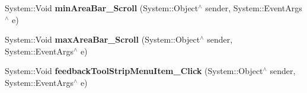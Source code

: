 \begin{DoxyCompactItemize}
System\+::\+Void {\bfseries min\+Area\+Bar\+\_\+\+Scroll} (System\+::\+Object$^\wedge$ sender, System\+::\+Event\+Args$^\wedge$ e)
\item 
\mbox{\label{class_gaze_track_g_u_i_1_1_g_u_i_a21a48dc15b2d022fce72b99b4f7483ae}} 
System\+::\+Void {\bfseries max\+Area\+Bar\+\_\+\+Scroll} (System\+::\+Object$^\wedge$ sender, System\+::\+Event\+Args$^\wedge$ e)
\item 
\mbox{\label{class_gaze_track_g_u_i_1_1_g_u_i_a8b1043a83aa43a444901279173903697}} 
System\+::\+Void {\bfseries feedback\+Tool\+Strip\+Menu\+Item\+\_\+\+Click} (System\+::\+Object$^\wedge$ sender, System\+::\+Event\+Args$^\wedge$ e)
\end{DoxyCompactItemize}
